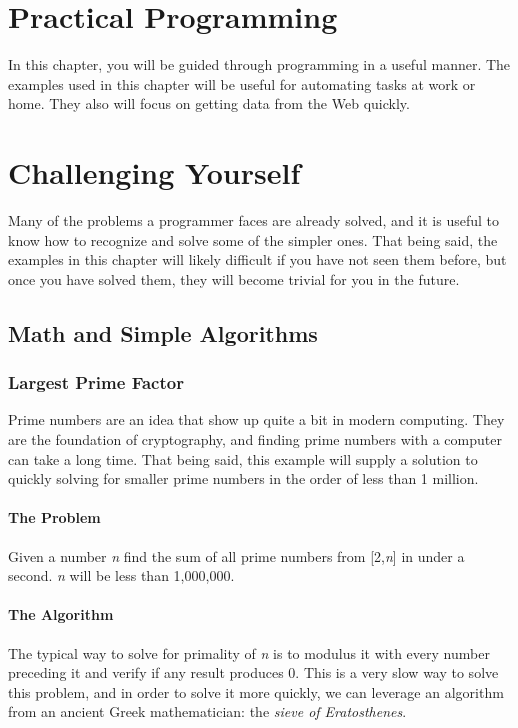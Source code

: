 \documentclass[12pt, oneside, a4paper]{book}
\begin{document}
   \chapter{Practical Programming}
   \label{chap:practical}
      In this chapter, you will be guided through programming in a useful manner.
      The examples used in this chapter will be useful for automating tasks at work or home.
      They also will focus on getting data from the Web quickly.
   \chapter{Challenging Yourself}
   \label{chap:challenge}
      Many of the problems a programmer faces are already solved, and it is useful to know how to recognize and solve some of the simpler ones.
      That being said, the examples in this chapter will likely difficult if you have not seen them before, but once you have solved them, they will become trivial for you in the future.

      \section{Math and Simple Algorithms}
         \subsection{Largest Prime Factor}
         Prime numbers are an idea that show up quite a bit in modern computing.
         They are the foundation of cryptography, and finding prime numbers with a computer can take a long time.
         That being said, this example will supply a solution to quickly solving for smaller prime numbers in the order of less than 1 million.

         \subsubsection{The Problem}
         Given a number \textit{n} find the sum of all prime numbers from [2,\textit{n}] in under a second.
         \textit{n} will be less than 1,000,000.

         \subsubsection{The Algorithm}
         The typical way to solve for primality of \textit{n} is to modulus it with every number preceding it and verify if any result produces 0.
         This is a very slow way to solve this problem, and in order to solve it more quickly, we can leverage an algorithm from an ancient Greek mathematician: the \textit{sieve of Eratosthenes}.
\end{document}
